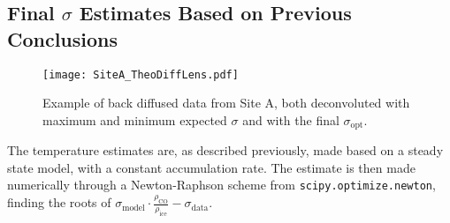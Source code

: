 \documentclass[../../CompleteThesis2/Complete_2ndDraft]{subfiles}
\begin{document}
%		




\subsection[Final $\sigma$ Estimates]{Final $\sigma$ Estimates Based on Previous Conclusions}
\label{Subsec:Results_DiffLenEst_AlphabetCores_FinalEstimates}
\begin{figure}[h]
	\centering
	\texttt{[image: SiteA\_TheoDiffLens.pdf]}
	\caption[$\sigma$, theoretical and optimal.]{\small Example of back diffused data from Site A, both deconvoluted with maximum and minimum expected $\sigma$ and with the final $\sigma_{\text{opt}}$.}
	\label{fig:SiteA_TheoDiffLens}
\end{figure}
The temperature estimates are, as described previously, made based on a steady state model, with a constant accumulation rate. The estimate is then made numerically through a Newton-Raphson scheme from \lstinline[language=Python]|scipy.optimize.newton|, finding the roots of $\sigma_{\text{model}}\cdot \frac{\rho_{\text{CO}}}{\rho_{\text{ice}}} - \sigma_{\text{data}}$.
\end{document}
